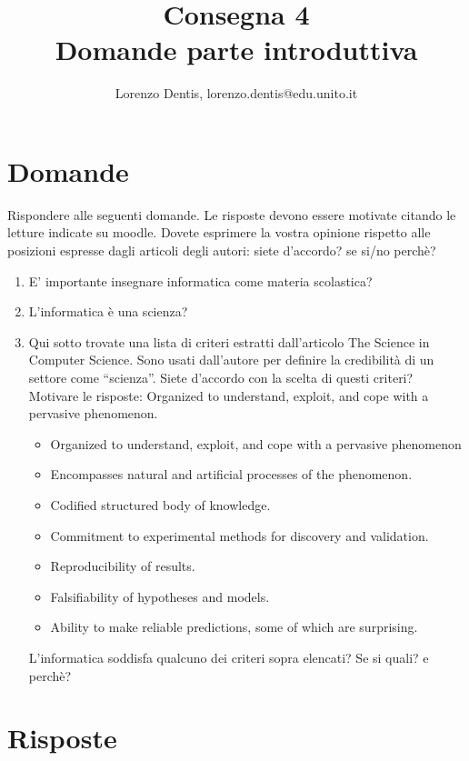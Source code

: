 \documentclass[a4paper]{article}
\begin{document}
\author{Lorenzo Dentis, lorenzo.dentis@edu.unito.it}
\title{Consegna 4 \\ \large Domande parte introduttiva}
\maketitle

\section{Domande}
Rispondere alle seguenti domande. Le risposte devono essere motivate citando le letture indicate su moodle. Dovete esprimere la vostra opinione  rispetto alle posizioni espresse dagli articoli degli autori: siete d’accordo? se si/no perchè?
\newline
\begin{enumerate}
	\item E’ importante insegnare informatica come materia scolastica?
	\item L’informatica è una scienza?
	\item Qui sotto trovate una lista di criteri estratti dall’articolo The Science in Computer Science. Sono usati dall’autore per definire la credibilità di un settore come “scienza”. Siete d’accordo con la scelta di questi criteri? Motivare le risposte:
Organized to understand, exploit, and cope with a pervasive phenomenon.
\begin{itemize}
	\item Organized to understand, exploit, and cope with a pervasive phenomenon
	\item Encompasses natural and artificial processes of the phenomenon.
	\item Codified structured body of knowledge.
	\item Commitment to experimental methods for discovery and validation.
	\item Reproducibility of results.
	\item Falsifiability of hypotheses and models.
	\item Ability to make reliable predictions, some of which are surprising.
\end{itemize}
	L’informatica soddisfa qualcuno dei criteri sopra elencati? Se si quali? e perchè?
\end{enumerate}
\newpage
\section{Risposte}
\end{document}
